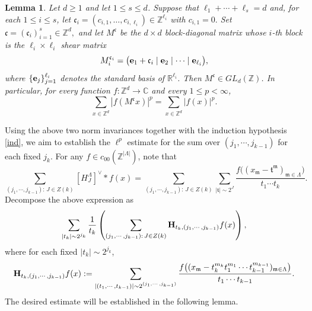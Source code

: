 \documentclass[11 pt,letterpaper]{amsart}
\theoremstyle{plain}
\newtheorem{lemma}{Lemma}\numberwithin{lemma}{section}
\theoremstyle{definition}
\theoremstyle{remark} \theoremstyle{exam} \theoremstyle{ob}
\numberwithin{equation}{section}
\begin{document}
\begin{lemma}\label{lem:shear} Let $d\ge 1$ and let $1\le s\le d$. Suppose that $ \ell_1+\cdots+\ell_s=d$ and, for each $1\le i\le s$, let $\mathfrak{c}_i = (c_{i,1},\ldots,c_{i,\ell_i}) \in\mathbb{Z}^{\ell_i}$ with $ c_{i,1}=0.$ Set  $ \mathfrak{c} = (\mathfrak{c}_i)_{i=1}^s\in\mathbb{Z}^d,$ and let $M^{\mathfrak{c}}$ be the $d\times d$ block-diagonal matrix whose $i$-th block is the $\ell_i\times\ell_i$ shear matrix \[ M_i^{\mathfrak{c}_i} = \bigl( {\bf e}_1+\mathfrak{c}_i \mid {\bf e}_2 \mid\cdots\mid {\bf e}_{\ell_i} \bigr), \] where $\{{\bf e}_j\}_{j=1}^{\ell_i}$ denotes the standard basis of $\mathbb{R}^{\ell_i}$. Then $M^{\mathfrak{c}}\in GL_d(\mathbb{Z})$. In particular, for every function $f:\mathbb{Z}^d\to\mathbb{C}$ and every $1\le p<\infty$, \[ \sum_{x\in\mathbb{Z}^d} \left|f(M^{\mathfrak{c}}x)\right|^p = \sum_{x\in\mathbb{Z}^d} |f(x)|^p. \] 
\end{lemma}



Using the above two norm invariances together with the induction hypothesis \eqref{ind}, we aim to establish the $\ell^p$ estimate for the sum over $(j_1,\cdots,j_{k-1})$ for each fixed $j_k$. For any $f\in c_{00}(\mathbb{Z}^{|\Lambda|})$, note that
\[
\sum_{(j_1,\cdots,j_{k-1}):\, J\in Z(k)}[H_J^{\Lambda}]^{\vee}*f(x)
=
\sum_{(j_1,\cdots,j_{k-1}):\, J\in Z(k)}
\sum_{|\mathfrak{t}|\sim 2^{J}}
\frac{ f\big((x_{\mathfrak{m}}-\mathfrak{t}^{\mathfrak{m}})_{\mathfrak{m}\in \Lambda} \big)}{t_1\cdots t_k}.
\]
Decompose the above expression as
\begin{align}\label{9nn}
\sum_{|t_k|\sim 2^{j_k}} \frac{1}{t_k}
\left(
\sum_{(j_1,\cdots,j_{k-1}):\, J\in Z(k)}
{\bf H}_{t_k,(j_1,\cdots,j_{k-1})}f(x)
\right),
\end{align}
where for each fixed $|t_k|\sim 2^{j_k}$,
\[
{\bf H}_{t_k,(j_1,\cdots,j_{k-1})}f(x)
:=
\sum_{|(t_1,\cdots,t_{k-1})|\sim 2^{(j_1,\cdots,j_{k-1})}}
\frac{
f\big((x_{\mathfrak{m}}-t_k^{m_k} t_1^{m_1}\cdots t_{k-1}^{m_{k-1}})_{\mathfrak{m}\in \Lambda}\big)
}{t_1\cdots t_{k-1}}.
\]
 The desired estimate will be established in the following lemma.
 
\end{document}
